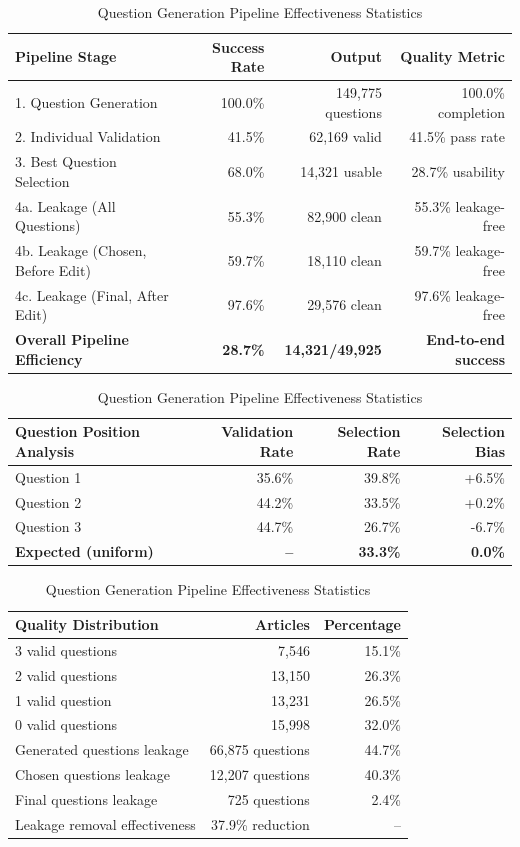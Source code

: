 \begin{table}[t]
\centering
\caption{Question Generation Pipeline Effectiveness Statistics}
\label{tab:pipeline_effectiveness}
\begin{tabular}{@{}lrrr@{}}
\toprule
\textbf{Pipeline Stage} & \textbf{Success Rate} & \textbf{Output} & \textbf{Quality Metric} \\
\midrule
1. Question Generation & 100.0\% & 149,775 questions & 100.0\% completion \\
2. Individual Validation & 41.5\% & 62,169 valid & 41.5\% pass rate \\
3. Best Question Selection & 68.0\% & 14,321 usable & 28.7\% usability \\
4a. Leakage (All Questions) & 55.3\% & 82,900 clean & 55.3\% leakage-free \\
4b. Leakage (Chosen, Before Edit) & 59.7\% & 18,110 clean & 59.7\% leakage-free \\
4c. Leakage (Final, After Edit) & 97.6\% & 29,576 clean & 97.6\% leakage-free \\
\midrule
\textbf{Overall Pipeline Efficiency} & \textbf{28.7\%} & \textbf{14,321/49,925} & \textbf{End-to-end success} \\
\bottomrule
\end{tabular}

\vspace{0.5em}
\begin{tabular}{@{}lrrr@{}}
\toprule
\textbf{Question Position Analysis} & \textbf{Validation Rate} & \textbf{Selection Rate} & \textbf{Selection Bias} \\
\midrule
Question 1 & 35.6\% & 39.8\% & +6.5\% \\
Question 2 & 44.2\% & 33.5\% & +0.2\% \\
Question 3 & 44.7\% & 26.7\% & -6.7\% \\
\midrule
\textbf{Expected (uniform)} & \textbf{--} & \textbf{33.3\%} & \textbf{0.0\%} \\
\bottomrule
\end{tabular}

\vspace{0.5em}
\begin{tabular}{@{}lrr@{}}
\toprule
\textbf{Quality Distribution} & \textbf{Articles} & \textbf{Percentage} \\
\midrule
3 valid questions & 7,546 & 15.1\% \\
2 valid questions & 13,150 & 26.3\% \\
1 valid question & 13,231 & 26.5\% \\
0 valid questions & 15,998 & 32.0\% \\
\midrule
Generated questions leakage & 66,875 questions & 44.7\% \\
Chosen questions leakage & 12,207 questions & 40.3\% \\
Final questions leakage & 725 questions & 2.4\% \\
Leakage removal effectiveness & 37.9\% reduction & -- \\
\bottomrule
\end{tabular}
\end{table}

